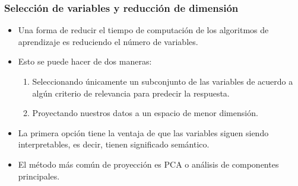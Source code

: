 \documentclass{beamer}
\begin{document}
\begin{frame}
\frametitle{Selección de variables y reducción de dimensión}

\begin{itemize}
\item Una forma de reducir el tiempo de computación de los algoritmos de aprendizaje es reduciendo el número de variables.
\item Esto se puede hacer de dos maneras:
\begin{enumerate}
\item Seleccionando únicamente un subconjunto de las variables de acuerdo a algún criterio de relevancia para predecir la respuesta.
\item Proyectando nuestros datos a un espacio de menor dimensión.
\end{enumerate}
\item La primera opción tiene la ventaja de que las variables siguen siendo interpretables, es decir, tienen significado semántico.
\item El método más común de proyección es PCA o análisis de componentes principales.
\end{itemize}
\end{frame}
\end{document}
